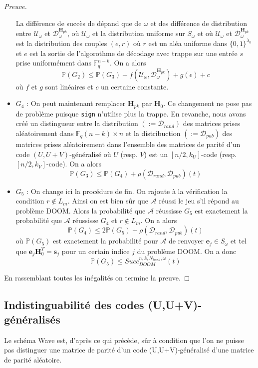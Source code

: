 \documentclass[12pt]{article}
\theoremstyle{plain}
\theoremstyle{definition}
\newcommand{\F}{\mathbb{F}}
\newcommand{\A}{\mathcal{A}}
\newcommand{\e}{\mathbf{e}}
\newcommand{\s}{\mathbf{s}}
\begin{document}
\begin{proof}[Preuve]
\begin{itemize}
 La différence de succès de dépand que de $\omega$ et des différence de distribution entre $\mathcal{U}_{\omega}$ et $\mathcal{D}_{\omega}^{\mathbf{H}_{pk}}$, où $\mathcal{U}_{\omega}$ et la distribution uniforme sur $S_{\omega}$ et où $\mathcal{U}_{\omega}$ et $\mathcal{D}_{\omega}^{\mathbf{H}_{pk}}$ est la distribution des couples $(e,r)$ où $r$ est un aléa uniforme dans $\{0,1\}^{\lambda_0}$ et $e$ est la sortie de l'algorothme de décodage avec trappe sur une entrée $s$ prise uniformément dans $\F_q^{n-k}$.
On a alors 
$$ \mathbb{P}(G_2) \leq  \mathbb{P}(G_3) + f(\mathcal{U}_{\omega},\mathcal{D}_{\omega}^{\mathbf{H}_{pk}}) + g(\epsilon) + c$$
où $f$ et $g$ sont linéaires et $c$ un certaine constante.
\item $G_4$ : On peut maintenant remplacer $\mathbf{H}_{pk}$ par $\mathbf{H}_0$. Ce changement ne pose pas de problème puisque \verb|sign| n'utilise plus la trappe. En revanche, nous avons créé un distingueur entre la distribution $(:=\mathcal{D}_{rand})$ des matrices prises aléatoirement dans $\F_q{(n-k)\times n}$ et la distribuction $(:=\mathcal{D}_{pub})$ des matrices prises aléatoirement dans l'ensemble des matrices de parité d'un code $(U,U+V)$-généralisé où $U$ (resp. $V$) est un $[n/2,k_U]$-code (resp. $[n/2,k_V]$-code). 
On a alors 
$$ \mathbb{P}(G_3) \leq  \mathbb{P}(G_4) + \rho(\mathcal{D}_{rand},\mathcal{D}_{pub})(t)$$
\item $G_5$ : On change ici la procédure de fin. On rajoute à la vérification la condition $r \notin L_m$. Ainsi on est bien sûr que $\A$ réussi le jeu s'il répond au problème DOOM. Alors la probabilité que $\A$ réussisse $G_5$ est exactement la probabilité que $\A$ réussisse $G_4$ et $r\notin L_m$.
On a alors 
$$ \mathbb{P}(G_4) \leq  2\mathbb{P}(G_5) + \rho(\mathcal{D}_{rand},\mathcal{D}_{pub})(t)$$
où $\mathbb{P}(G_5)$ est exactement la probabilité pour $\A$ de renvoyer $\e_j \in S_{\omega}$ et tel que $\e_j\mathbf{H}_0^T = \s_j$ pour un certain indice $j$ du problème DOOM. On a donc 
$$ \mathbb{P}(G_5) \leq Succ^{n,k,N_{hash}, \omega}_{DOOM}(t)$$
\end{itemize}
En rassemblant toutes les inégalités on termine la preuve. 
\end{proof}


\subsection{Indistinguabilité des codes (U,U+V)-généralisés}

Le schéma Wave est, d'après ce qui précède, sûr à condition que l'on ne puisse pas distinguer une matrice de parité d'un code (U,U+V)-généralisé d'une matrice de parité aléatoire. \\
\end{document}
